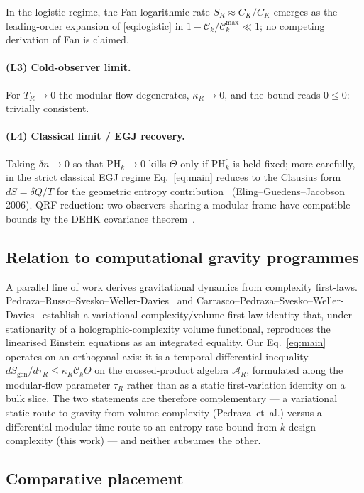 \documentclass[aps,prd,superscriptaddress,nofootinbib,floatfix,10pt]{revtex4-2}
\theoremstyle{remark}
\newcommand{\Sgen}{S_{\mathrm{gen}}}
\newcommand{\tauR}{\tau_{R}}
\newcommand{\kR}{\kappa_{R}}
\newcommand{\Ck}{\mathcal{C}_{k}}
\newcommand{\PHk}{\mathrm{PH}_{k}}
\newcommand{\dn}{\delta n}
\newcommand{\AR}{\mathcal{A}_{R}}
\begin{document}
In the logistic regime, the Fan logarithmic rate
$\dot S_{R}\approx\dot C_{K}/C_{K}$ emerges as the leading-order
expansion of \eqref{eq:logistic} in $1-\Ck/\Ck^{\max}\ll 1$; no
competing derivation of Fan is claimed.

\paragraph{(L3) Cold-observer limit.}
For $T_{R}\to 0$ the modular flow degenerates, $\kR\to 0$, and the
bound reads $0 \le 0$: trivially consistent.

\paragraph{(L4) Classical limit / EGJ recovery.}
Taking $\dn\to 0$ so that $\PHk\to 0$ kills $\Theta$ only if
$\PHk^{\mathrm{c}}$ is held fixed; more carefully, in the strict
classical EGJ regime Eq.~\eqref{eq:main} reduces to the Clausius
form $dS = \delta Q/T$ for the geometric entropy
contribution~\cite{Jacobson1995} (Eling--Guedens--Jacobson 2006). QRF reduction: two
observers sharing a modular frame have compatible bounds by the
DEHK covariance theorem~\cite{DEHK2025a,DEHK2025b}.

\subsection{Relation to computational gravity programmes}
\label{sec:compgrav}

A parallel line of work derives gravitational dynamics from complexity
first-laws. Pedraza--Russo--Svesko--Weller-Davies~\cite{Pedraza2022Threads}
and Carrasco--Pedraza--Svesko--Weller-Davies~\cite{Carrasco2023} establish
a variational complexity/volume first-law identity that, under
stationarity of a holographic-complexity volume functional, reproduces the
linearised Einstein equations as an integrated equality. Our
Eq.~\eqref{eq:main} operates on an orthogonal axis: it is a temporal
differential inequality $d\Sgen/d\tauR \le \kR \Ck \Theta$ on the
crossed-product algebra $\AR$, formulated along the modular-flow
parameter $\tauR$ rather than as a static first-variation identity on a
bulk slice. The two statements are therefore complementary --- a
variational static route to gravity from volume-complexity
(Pedraza~et~al.) versus a differential modular-time route to an
entropy-rate bound from $k$-design complexity (this work) --- and neither
subsumes the other.

\subsection{Comparative placement}
\label{sec:comparative}
\end{document}

